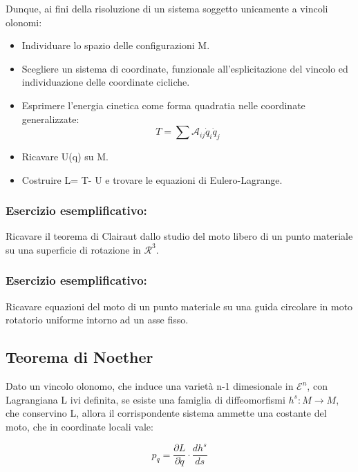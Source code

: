 \documentclass{article}
\begin{document}
            Dunque, ai fini della risoluzione di un sistema soggetto unicamente a vincoli olonomi:

            \begin{itemize}
                \item Individuare lo spazio delle configurazioni M.
                \item Scegliere un sistema di coordinate, funzionale all'esplicitazione del vincolo ed individuazione delle coordinate cicliche.
                \item Esprimere l'energia cinetica come forma quadratia nelle coordinate generalizzate:
                      \begin{equation}
                          T= \sum \mathcal{A}_{ij} \dot q_i \dot q_j
                      \end{equation}
                \item Ricavare U(q) su M.
                \item Costruire L= T- U e trovare le equazioni di Eulero-Lagrange.
            \end{itemize}

            \subsubsection{Esercizio esemplificativo:}
            Ricavare il teorema di Clairaut dallo studio del moto libero di un punto materiale su una superficie di rotazione in $\mathcal{R}^3$.

            \subsubsection{Esercizio esemplificativo:}
            Ricavare equazioni del moto di un punto materiale su una guida circolare in moto rotatorio uniforme intorno ad un asse fisso.

            \subsection{Teorema di Noether}
            Dato un vincolo olonomo, che induce una varietà n-1 dimesionale in $\mathcal{E}^n$, con Lagrangiana L ivi definita, se esiste una famiglia di diffeomorfismi $h^s: M\rightarrow M$, che conservino L, allora il corrispondente sistema ammette una costante del moto, che in coordinate locali vale:

            \begin{equation}
                p_q= \frac{\partial L}{\partial \dot q}\cdot \frac{d h^s}{ds}
            \end{equation}
\end{document}
